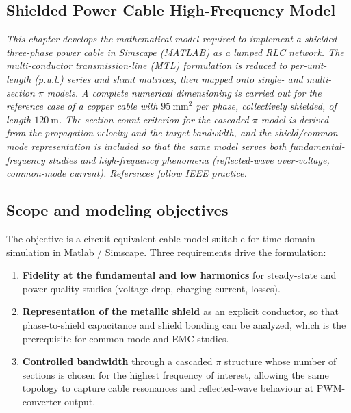 \documentclass[11pt,a4paper,oneside]{book}
\begin{document}
\begin{onehalfspace}
\begin{appendices}

\chapter{Shielded Power Cable High-Frequency Model}
\textit{This chapter develops the mathematical model required to implement a shielded
	three-phase power cable in Simscape (MATLAB) as a lumped RLC network. The
	multi-conductor transmission-line (MTL) formulation is reduced to per-unit-length
	(p.u.l.) series and shunt matrices, then mapped onto single- and multi-section
	$\pi$ models. A complete numerical dimensioning is carried out for the reference
	case of a copper cable with $95\ \mathrm{mm^2}$ per phase, collectively shielded,
	of length $120\ \mathrm{m}$. The section-count criterion for the cascaded $\pi$
	model is derived from the propagation velocity and the target bandwidth, and the
	shield/common-mode representation is included so that the same model serves both
	fundamental-frequency studies and high-frequency phenomena (reflected-wave
	over-voltage, common-mode current). References follow IEEE practice.}
\section{Scope and modeling objectives}
The objective is a circuit-equivalent cable model suitable for time-domain
simulation in Matlab / Simscape. Three
requirements drive the formulation:

\begin{enumerate}[leftmargin=*]
	\item \textbf{Fidelity at the fundamental and low harmonics} for steady-state and
	power-quality studies (voltage drop, charging current, losses).
	\item \textbf{Representation of the metallic shield} as an explicit conductor, so
	that phase-to-shield capacitance and shield bonding can be analyzed, which is the
	prerequisite for common-mode and EMC studies.
	\item \textbf{Controlled bandwidth} through a cascaded $\pi$ structure whose number
	of sections is chosen for the highest frequency of interest, allowing the same
	topology to capture cable resonances and reflected-wave behaviour at PWM-converter
	output.
\end{enumerate}


\end{appendices}
\end{onehalfspace}
\end{document}
